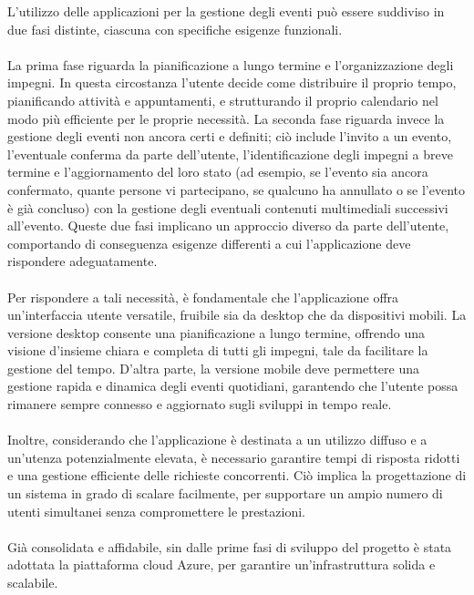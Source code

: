 L’utilizzo delle applicazioni per la gestione degli eventi può essere suddiviso in due fasi distinte, 
ciascuna con specifiche esigenze funzionali.\\
\\
La prima fase riguarda la pianificazione a lungo termine e l’organizzazione degli impegni.
In questa circostanza l’utente decide come distribuire il proprio tempo, pianificando attività e appuntamenti,
e strutturando il proprio calendario nel modo più efficiente per le proprie necessità.
La seconda fase riguarda invece la gestione degli eventi non ancora certi e definiti;
ciò include l’invito a un evento, l’eventuale conferma da parte dell’utente,
l’identificazione degli impegni a breve termine e l’aggiornamento del loro stato
(ad esempio, se l’evento sia ancora confermato, quante persone vi partecipano, se qualcuno ha annullato o se l'evento è già concluso)
con la gestione degli eventuali contenuti multimediali successivi all’evento. 
Queste due fasi implicano un approccio diverso da parte dell’utente,
comportando di conseguenza esigenze differenti a cui l’applicazione deve rispondere adeguatamente.\\
\\
Per rispondere a tali necessità, è fondamentale che l'applicazione offra un'interfaccia utente versatile, 
fruibile sia da desktop che da dispositivi mobili.
La versione desktop consente una pianificazione a lungo termine, offrendo una visione d'insieme chiara e completa di tutti gli impegni,
tale da facilitare la gestione del tempo.
D'altra parte, la versione mobile deve permettere una gestione rapida e dinamica degli eventi quotidiani,
garantendo che l'utente possa rimanere sempre connesso e aggiornato sugli sviluppi in tempo reale.\\
\\
Inoltre, considerando che l'applicazione è destinata a un utilizzo diffuso e a un'utenza potenzialmente elevata,
è necessario garantire tempi di risposta ridotti e una gestione efficiente delle richieste concorrenti.
Ciò implica la progettazione di un sistema in grado di scalare facilmente,
per supportare un ampio numero di utenti simultanei senza compromettere le prestazioni.\\
\\
Già consolidata e affidabile, sin dalle prime fasi di sviluppo del progetto è stata adottata la piattaforma cloud Azure, per garantire un'infrastruttura solida e scalabile.
\clearpage



